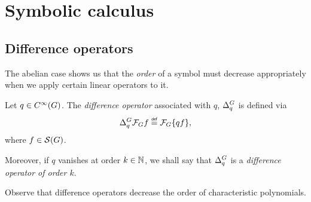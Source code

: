 \chapter{Symbolic calculus}
\label{chapter:symbolic_calculus}

\section{Difference operators}

The abelian case shows us that the \emph{order} of a symbol
must decrease appropriately when we apply certain linear operators to it.

\begin{definition}
\label{definition:difference_operators}
    Let $q \in {C^\infty(G)}$.
    The \emph{difference operator} associated with $q$, ${\Delta^{G}_{q}}$ is defined via
    \begin{align*}
        \DifferenceOperator{q} \Fourier f \defeq \Fourier\{q f\},
    \end{align*}
    where $f \in {\mathcal{S} (G)}$.

    Moreover, if $q$ vanishes at order $k \in \mathbb{N}$,
    we shall say that ${\Delta^{G}_{q}}$ is a \emph{difference operator of order $k$}.
\end{definition}

Observe that difference operators decrease the order of characteristic polynomials.

